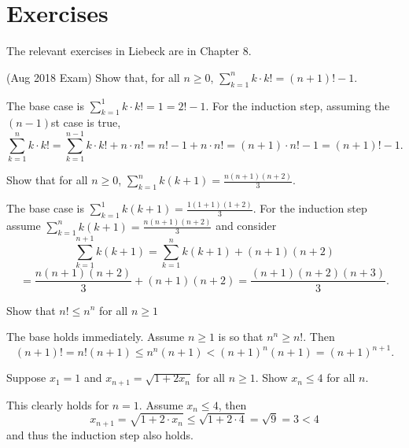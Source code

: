 \documentclass[11pt,dvipsnames]{book}
\numberwithin{figure}{section} %
\numberwithin{table}{section} %
\begin{document}
\section{Exercises}

The relevant exercises in Liebeck are in Chapter 8.

\begin{exercise}
(Aug 2018 Exam) Show that, for all $n\geq 0$, $\sum_{k=1}^{n} k\cdot k! = (n+1)!-1$.
\begin{solution}
The base case is $\sum_{k=1}^{1} k\cdot k!=1=2!-1$. For the induction step, assuming the $(n-1)$st case is true,
\[
\sum_{k=1}^{n} k\cdot k!
=\sum_{k=1}^{n-1} k\cdot k! + n\cdot n!
=n!-1+ n\cdot n!
=(n+1)\cdot n! -1 = (n+1)!-1.
\]
\end{solution}
\end{exercise}

\begin{exercise}
Show that for all $n\geq 0$, $\sum_{k=1}^{n} k(k+1) = \frac{n(n+1)(n+2)}{3}$.
\begin{solution}
The base case is $\sum_{k=1}^{1} k(k+1) = \frac{1(1+1)(1+2)}{3}$.
For the induction step assume $\sum_{k=1}^{n} k(k+1) = \frac{n(n+1)(n+2)}{3}$ and consider
\[
\sum_{k=1}^{n+1} k(k+1) =
\sum_{k=1}^{n} k(k+1) +(n+1)(n+2) \]
\[
= \frac{n(n+1)(n+2)}{3}+(n+1)(n+2)
=\frac{(n+1)(n+2)(n+3)}{3}.
\]
\end{solution}
\end{exercise}

\begin{exercise}
Show that $n!\leq n^{n}$ for all $n\geq 1$
\begin{solution}
The base holds immediately. Assume $n\geq 1$ is so that $n^{n}\geq n!$. Then
\[
(n+1)!=n! (n+1)\leq n^{n} (n+1)<(n+1)^{n}(n+1)=(n+1)^{n+1}.
\]
\end{solution}
\end{exercise}

\begin{exercise} Suppose $x_{1}=1$ and $x_{n+1} = \sqrt{1+2x_{n}}$ for all $n\geq 1$. Show $x_{n}\leq 4$ for all $n$. \\
\begin{solution}
This clearly holds for $n=1$. Assume $x_{n}\leq 4$, then
\[
x_{n+1}= \sqrt{1+2\cdot x_{n}}\leq \sqrt{1+2\cdot 4}=\sqrt{9}=3<4\]
and thus the induction step also holds.
\end{solution}
\end{exercise}
\end{document}
